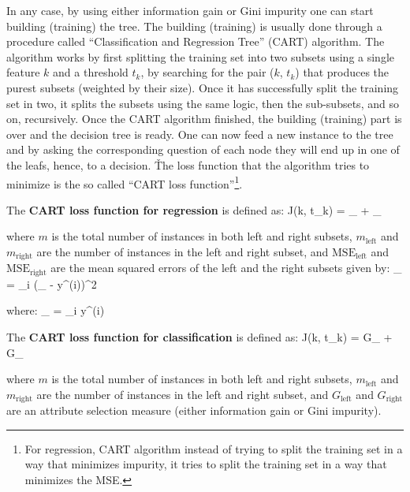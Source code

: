 In any case, by using either information gain or Gini impurity one can start building (training) the tree. The
building (training) is usually done through a procedure called ``Classification and Regression Tree'' (CART)
algorithm. The algorithm works by first splitting the training set into two subsets using a single feature $k$ and a
threshold $t_k$, by searching for the pair ($k$, $t_k$) that produces the purest subsets (weighted by their size).
Once it has successfully split the training set in two, it splits the subsets using the same logic, then the
sub-subsets, and so on, recursively. Once the CART algorithm finished, the building (training) part is over and the
decision tree is ready. One can now feed a new instance to the tree and by asking the corresponding question of each
node they will end up in one of the leafs, hence, to a decision. \v

The loss function that the algorithm tries to minimize is the so called ``CART loss function''\footnote{For regression,
CART algorithm instead of trying to split the training set in a way that minimizes impurity, it tries to split the
training set in a way that minimizes the MSE\@.}.

The \textbf{CART loss function for regression} is defined as:
\bse
J(k, t_{k}) =  _{} + _{}
\ese

where $m$ is the total number of instances in both left and right subsets, $m_{\text{left}}$ and $m_{\text{right}}$ are
the number of instances in the left and right subset, and $\text{MSE}_{\text{left}}$ and $\text{MSE}_{\text{right}}$ are
the mean squared errors of the left and the right subsets given by:
\bse
{}_{} = \sum_{i \in {}} ({}_ - y^{(i)})^2
\ese

where:
\bse
{}_ =  \sum_{i \in {}} y^{(i)}
\ese

The \textbf{CART loss function for classification} is defined as:
\bse
J(k, t_{k}) =  G_{} +  G_{}
\ese

where $m$ is the total number of instances in both left and right subsets, $m_{\text{left}}$ and $m_{\text{right}}$ are
the number of instances in the left and right subset, and $G_{\text{left}}$ and $G_{\text{right}}$ are an attribute
selection measure (either information gain or Gini impurity).
\ed

